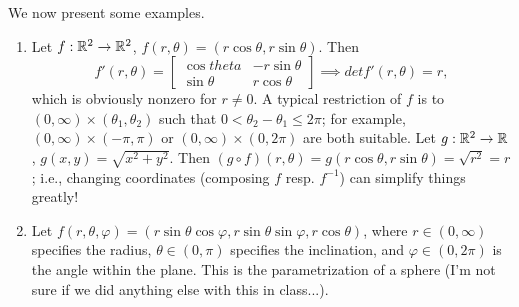 We now present some examples.
\begin{enumerate}[label=(\alph*)]
    \item Let $f : \mathbb R^2 \to \mathbb R^2$, $f(r, \theta) = (r \cos \theta, r \sin \theta)$. Then
    \[ f'(r, \theta) = \begin{bmatrix} \cos theta & - r \sin \theta \\ \sin \theta & r \cos \theta \end{bmatrix} \implies det f'(r, \theta) = r, \]
    which is obviously nonzero for $r \neq 0$. A typical restriction of $f$ is to $(0, \infty) \times (\theta_1, \theta_2)$ such that $0 < \theta_2 - \theta_1 \leq 2\pi$; for example, $(0, \infty) \times (-\pi, \pi)$ or $(0, \infty) \times (0, 2\pi)$ are both suitable.
    \medskip\newline
    Let $g : \mathbb R^2 \to \mathbb R$, $g(x, y) = \sqrt{x^2 + y^2}$. Then $(g \circ f)(r, \theta) = g(r \cos \theta, r \sin \theta) = \sqrt{r^2} = r$; i.e., changing coordinates (composing $f$ resp. $f^{-1}$) can simplify things greatly!
    \item Let $f(r, \theta, \varphi) = (r \sin \theta \cos \varphi, r \sin \theta \sin \varphi, r \cos \theta)$, where $r \in (0, \infty)$ specifies the radius, $\theta \in (0, \pi)$ specifies the inclination, and $\varphi \in (0, 2\pi)$ is the angle within the plane. This is the parametrization of a sphere (I'm not sure if we did anything else with this in class...).
\end{enumerate}
